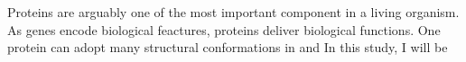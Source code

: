 Proteins are arguably one of the most important component in a living organism. As genes encode biological feactures, proteins deliver biological functions. One protein can adopt many structural conformations in and   In this study, I will be 